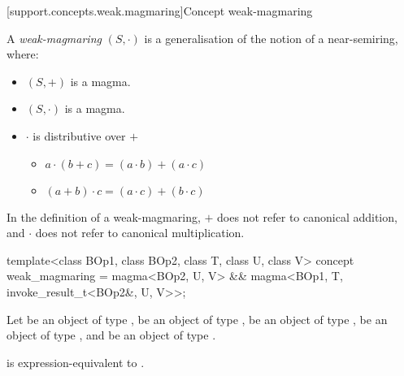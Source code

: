 

[support.concepts.weak.magmaring]{Concept weak-magmaring}

\pnum
A \textit{weak-magmaring} $(S, \cdot)$ is a generalisation of the notion of a near-semiring, where:
\begin{itemize}
   \item $(S, +)$ is a magma.
   \item $(S, \cdot)$ is a magma.
   \item $\cdot$ is distributive over $+$
   \begin{itemize}
      \item $a \cdot (b + c) = (a \cdot b) + (a \cdot c)$
      \item $(a + b) \cdot c = (a \cdot c) + (b \cdot c)$
   \end{itemize}
\end{itemize}
\begin{note}
   In the definition of a weak-magmaring, $+$ does not refer to canonical addition, and $\cdot$ does
   not refer to canonical multiplication.
\end{note}

\begin{itemdecl}
  template<class BOp1, class BOp2, class T, class U, class V>
  concept weak_magmaring = magma<BOp2, U, V> && magma<BOp1, T, invoke_result_t<BOp2&, U, V>>;
\end{itemdecl}
\begin{itemdescr}
   \pnum
   Let  be an object of type ,  be an object of type
   ,  be an object of type ,  be an object of type ,
   and  be an object of type .

   \pnum
    is expression-equivalent to
   .
\end{itemdescr}


